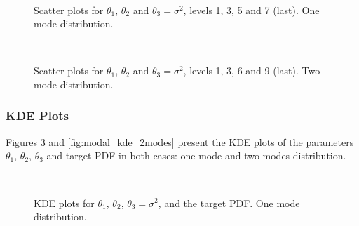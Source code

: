 \begin{figure}[htpb]
\centering
\\
\vspace{-10pt}
\caption{Scatter plots for $\theta_1$, $\theta_2$ and $\theta_3=\sigma^2$, levels 1, 3, 5 and 7 (last). One mode distribution.}
\label{fig:modal_scatter_1mode}
\end{figure}

\begin{figure}[htpb]
\centering
\\
\vspace{-10pt}
\caption{Scatter plots for $\theta_1$, $\theta_2$ and $\theta_3=\sigma^2$, levels 1, 3, 6 and 9 (last). Two-mode distribution.}
\label{fig:modal_scatter_2modes}
\end{figure}

\subsubsection{KDE Plots}

Figures \ref{fig:modal_kde_1mode} and \ref{fig:modal_kde_2modes} present the KDE plots of the parameters $\theta_1$, $\theta_2$, $\theta_3$ and target PDF in both cases: one-mode and two-modes distribution.



\begin{figure}[hptb]
\centering
{}
\\
\vspace{-10pt}
\caption{KDE plots for $\theta_1$, $\theta_2$, $\theta_3=\sigma^2$, and the target PDF. One mode distribution.}
\label{fig:modal_kde_1mode}
\end{figure}

